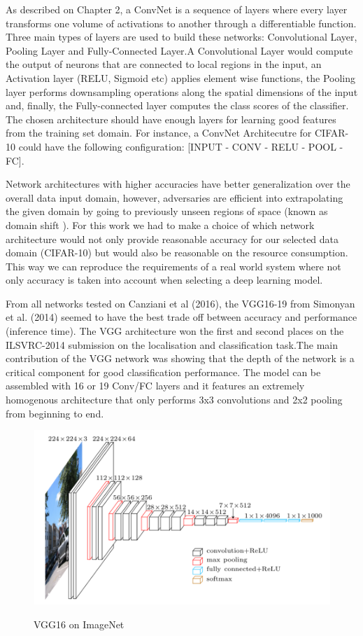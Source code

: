 As described on Chapter 2, a ConvNet is a sequence of layers where every layer transforms one volume of activations to another through a differentiable function. Three main types of layers are used to build these networks: Convolutional Layer, Pooling Layer and Fully-Connected Layer.A Convolutional Layer would compute the output of neurons that are connected to local regions in the input, an Activation layer (RELU, Sigmoid etc) applies element wise functions, the Pooling layer performs downsampling operations along the spatial dimensions of the input and, finally, the Fully-connected layer computes the class scores of the classifier. The chosen architecture should have enough layers for learning good features from the training set domain. For instance, a ConvNet Architecutre for CIFAR-10 could have the following configuration: [INPUT - CONV - RELU - POOL - FC].

Network architectures with higher accuracies have better generalization over the overall data input domain, however, adversaries are efficient into extrapolating the given domain by going to previously unseen regions of space (known as domain shift \cite{papernot2016}). For this work we had to make a choice of which network architecture would not only provide reasonable accuracy for our selected data domain (CIFAR-10) but would also be reasonable on the resource consumption. This way we can reproduce the requirements of a real world system where not only accuracy is taken into account when selecting a deep learning model.

From all networks tested on Canziani et al (2016), the VGG16-19 from Simonyan et al. (2014)  seemed to have the best trade off between accuracy and performance (inference time). The VGG architecture won the first and second places on the ILSVRC-2014 submission on the localisation and classification task.The main contribution of the VGG network was showing that the depth of the network is a critical component for good classification performance. The model can be assembled with 16 or 19 Conv/FC layers and it features an extremely homogenous architecture that only performs 3x3 convolutions and 2x2 pooling from beginning to end.

\begin{figure}[!h]
	\centering
	\includegraphics[scale=0.6]{imagenet_vgg16.png}
	\caption{VGG16 on ImageNet}
	\cite{simonyan2014very}
	\label{fig:vgg16}
\end{figure}

